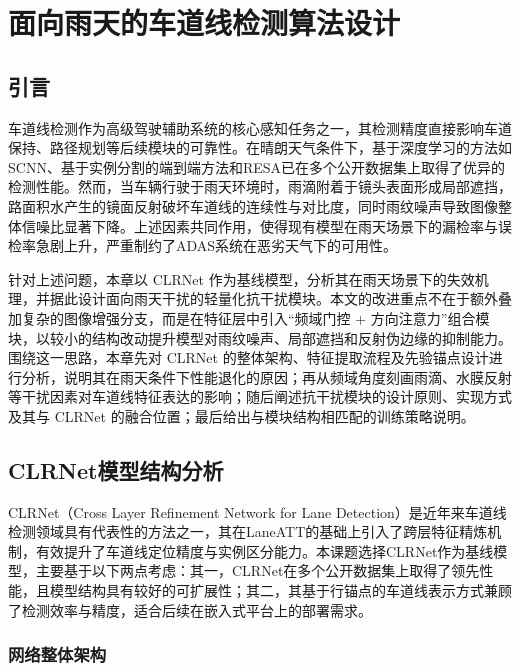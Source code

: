\chapter{面向雨天的车道线检测算法设计}
\label{chap:algorithm_design}

\section{引言}
\label{sec:intro_4}

车道线检测作为高级驾驶辅助系统的核心感知任务之一，其检测精度直接影响车道保持、路径规划等后续模块的可靠性。在晴朗天气条件下，基于深度学习的方法如SCNN\cite{pan2018spatial}、基于实例分割的端到端方法\cite{neven2018}和RESA\cite{zheng2021}已在多个公开数据集上取得了优异的检测性能。然而，当车辆行驶于雨天环境时，雨滴附着于镜头表面形成局部遮挡，路面积水产生的镜面反射破坏车道线的连续性与对比度，同时雨纹噪声导致图像整体信噪比显著下降。上述因素共同作用，使得现有模型在雨天场景下的漏检率与误检率急剧上升，严重制约了ADAS系统在恶劣天气下的可用性。

针对上述问题，本章以 CLRNet 作为基线模型，分析其在雨天场景下的失效机理，并据此设计面向雨天干扰的轻量化抗干扰模块。本文的改进重点不在于额外叠加复杂的图像增强分支，而是在特征层中引入“频域门控 + 方向注意力”组合模块，以较小的结构改动提升模型对雨纹噪声、局部遮挡和反射伪边缘的抑制能力。围绕这一思路，本章先对 CLRNet 的整体架构、特征提取流程及先验锚点设计进行分析，说明其在雨天条件下性能退化的原因；再从频域角度刻画雨滴、水膜反射等干扰因素对车道线特征表达的影响；随后阐述抗干扰模块的设计原则、实现方式及其与 CLRNet 的融合位置；最后给出与模块结构相匹配的训练策略说明。

\section{CLRNet模型结构分析}
\label{sec:clrnet_analysis}

CLRNet（Cross Layer Refinement Network for Lane Detection）是近年来车道线检测领域具有代表性的方法之一，其在LaneATT的基础上引入了跨层特征精炼机制，有效提升了车道线定位精度与实例区分能力。本课题选择CLRNet作为基线模型，主要基于以下两点考虑：其一，CLRNet在多个公开数据集上取得了领先性能，且模型结构具有较好的可扩展性；其二，其基于行锚点的车道线表示方式兼顾了检测效率与精度，适合后续在嵌入式平台上的部署需求。

\subsection{网络整体架构}

